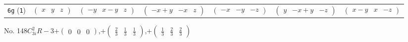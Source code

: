 \documentclass[fleqn,9pt,landscape]{jsarticle}
\begin{document}
\begin{center}
\begin{longtable}{ccccccc}
{\tt 6g} ({\tt 1}) & $ \begin{pmatrix} x & y & z \end{pmatrix} $ & $ \begin{pmatrix} - y & x - y & z \end{pmatrix} $ & $ \begin{pmatrix} - x + y & - x & z \end{pmatrix} $ & $ \begin{pmatrix} - x & - y & - z \end{pmatrix} $ & $ \begin{pmatrix} y & - x + y & - z \end{pmatrix} $ & $ \begin{pmatrix} x - y & x & - z \end{pmatrix} $ \\
\end{longtable}
\end{center}
\newpage
No. 148\quad$C_{3i}^{2}$\quad$R-3$\quad[ trigonal ]\quad$+\begin{pmatrix} 0 & 0 & 0 \end{pmatrix}$,\quad $+\begin{pmatrix} \frac{2}{3} & \frac{1}{3} & \frac{1}{3} \end{pmatrix}$,\quad $+\begin{pmatrix} \frac{1}{3} & \frac{2}{3} & \frac{2}{3} \end{pmatrix}$
\end{document}
